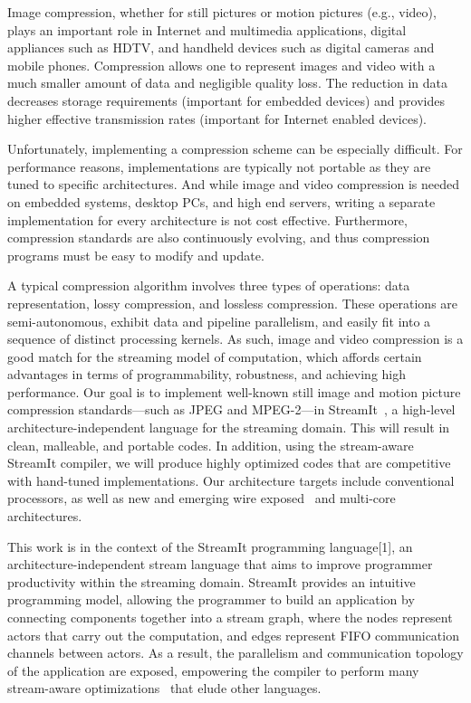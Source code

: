 
Image compression, whether for still pictures or motion pictures
(e.g., video), plays an important role in Internet and multimedia
applications, digital appliances such as HDTV, and handheld devices
such as digital cameras and mobile phones. Compression allows one to
represent images and video with a much smaller amount of data and
negligible quality loss. The reduction in data decreases storage
requirements (important for embedded devices) and provides higher
effective transmission rates (important for Internet enabled devices).

Unfortunately, implementing a compression scheme can be especially
difficult. For performance reasons, implementations are typically not
portable as they are tuned to specific architectures. And while image
and video compression is needed on embedded systems, desktop PCs, and
high end servers, writing a separate implementation for every
architecture is not cost effective. Furthermore, compression standards
are also continuously evolving, and thus compression programs must be
easy to modify and update.

A typical compression algorithm involves three types of operations:
data representation, lossy compression, and lossless
compression. These operations are semi-autonomous, exhibit data and
pipeline parallelism, and easily fit into a sequence of distinct
processing kernels. As such, image and video compression is a good
match for the streaming model of computation, which affords certain
advantages in terms of programmability, robustness, and achieving high
performance. Our goal is to implement well-known still image and
motion picture compression standards---such as JPEG and MPEG-2---in
StreamIt~\cite{streamit}, a high-level architecture-independent
language for the streaming domain. This will result in clean,
malleable, and portable codes.
In addition, using the stream-aware StreamIt compiler, we will produce
highly optimized codes that are competitive with hand-tuned
implementations. Our architecture targets include conventional
processors, as well as new and emerging wire exposed~\cite{raw} and
multi-core architectures.

This work is in the context of the StreamIt programming language[1],
an architecture-independent stream language that aims to improve
programmer productivity within the streaming domain. StreamIt provides
an intuitive programming model, allowing the programmer to build an
application by connecting components together into a stream graph,
where the nodes represent actors that carry out the computation, and
edges represent FIFO communication channels between actors. As a
result, the parallelism and communication topology of the application
are exposed, empowering the compiler to perform many stream-aware
optimizations~\cite{andrew,sitij,gordo,janis} that elude other languages.

